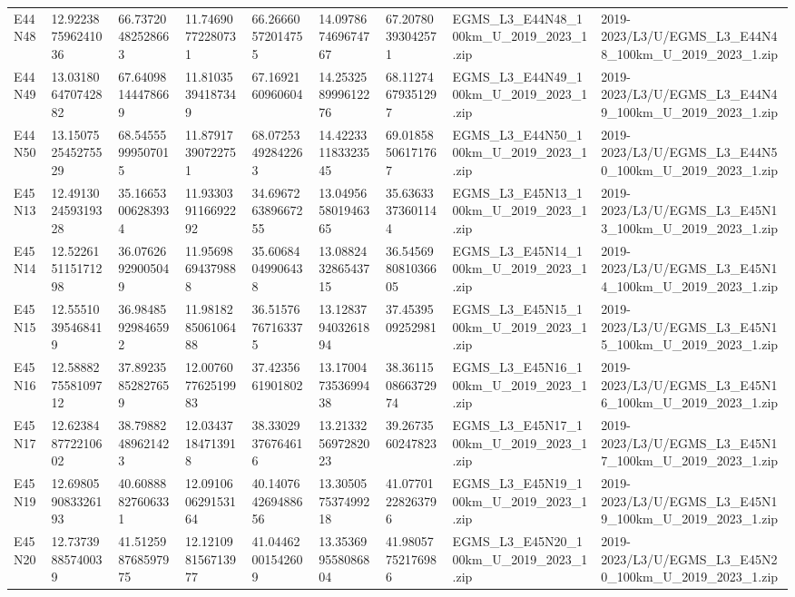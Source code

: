 \begin{landscape}
\begin{longtable}{lllllllll}
E44N48 & 12.922387596241036 & 66.73720482528663 & 11.74690772280731 & 66.26660572014755 & 14.097867469674767 & 67.20780393042571 & EGMS\_L3\_E44N48\_100km\_U\_2019\_2023\_1.zip & 2019-2023/L3/U/EGMS\_L3\_E44N48\_100km\_U\_2019\_2023\_1.zip \\
E44N49 & 13.031806470742882 & 67.64098144478669 & 11.81035394187349 & 67.1692160960604 & 14.253258999612276 & 68.11274679351297 & EGMS\_L3\_E44N49\_100km\_U\_2019\_2023\_1.zip & 2019-2023/L3/U/EGMS\_L3\_E44N49\_100km\_U\_2019\_2023\_1.zip \\
E44N50 & 13.150752545275529 & 68.54555999507015 & 11.87917390722751 & 68.07253492842263 & 14.422331183323545 & 69.01858506171767 & EGMS\_L3\_E44N50\_100km\_U\_2019\_2023\_1.zip & 2019-2023/L3/U/EGMS\_L3\_E44N50\_100km\_U\_2019\_2023\_1.zip \\
E45N13 & 12.491302459319328 & 35.16653006283934 & 11.933039116692292 & 34.696726389667255 & 13.049565801946365 & 35.63633373601144 & EGMS\_L3\_E45N13\_100km\_U\_2019\_2023\_1.zip & 2019-2023/L3/U/EGMS\_L3\_E45N13\_100km\_U\_2019\_2023\_1.zip \\
E45N14 & 12.522615115171298 & 36.07626929005049 & 11.95698694379888 & 35.60684049906438 & 13.088243286543715 & 36.545698081036605 & EGMS\_L3\_E45N14\_100km\_U\_2019\_2023\_1.zip & 2019-2023/L3/U/EGMS\_L3\_E45N14\_100km\_U\_2019\_2023\_1.zip \\
E45N15 & 12.55510395468419 & 36.98485929846592 & 11.981828506106488 & 36.51576767163375 & 13.128379403261894 & 37.4539509252981 & EGMS\_L3\_E45N15\_100km\_U\_2019\_2023\_1.zip & 2019-2023/L3/U/EGMS\_L3\_E45N15\_100km\_U\_2019\_2023\_1.zip \\
E45N16 & 12.588827558109712 & 37.89235852827659 & 12.007607762519983 & 37.4235661901802 & 13.170047353699438 & 38.361150866372974 & EGMS\_L3\_E45N16\_100km\_U\_2019\_2023\_1.zip & 2019-2023/L3/U/EGMS\_L3\_E45N16\_100km\_U\_2019\_2023\_1.zip \\
E45N17 & 12.623848772210602 & 38.79882489621423 & 12.03437184713918 & 38.33029376764616 & 13.213325697282023 & 39.2673560247823 & EGMS\_L3\_E45N17\_100km\_U\_2019\_2023\_1.zip & 2019-2023/L3/U/EGMS\_L3\_E45N17\_100km\_U\_2019\_2023\_1.zip \\
E45N19 & 12.698059083326193 & 40.60888827606331 & 12.091060629153164 & 40.140764269488656 & 13.305057537499218 & 41.07701228263796 & EGMS\_L3\_E45N19\_100km\_U\_2019\_2023\_1.zip & 2019-2023/L3/U/EGMS\_L3\_E45N19\_100km\_U\_2019\_2023\_1.zip \\
E45N20 & 12.73739885740039 & 41.512598768597975 & 12.121098156713977 & 41.04462001542609 & 13.353699558086804 & 41.98057752176986 & EGMS\_L3\_E45N20\_100km\_U\_2019\_2023\_1.zip & 2019-2023/L3/U/EGMS\_L3\_E45N20\_100km\_U\_2019\_2023\_1.zip \\

\end{longtable}
\end{landscape}
